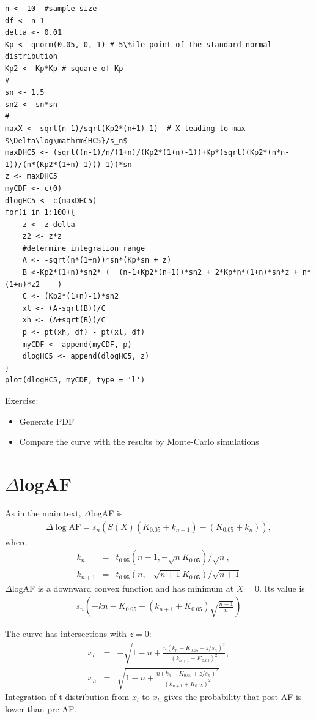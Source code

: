 \documentclass[10pt]{article}
\begin{document}
\begin{lstlisting}[caption=CDF of $\Delta\log\mathrm{HC5}/s_n$ (or that when $s_n$ is 1), label=fuga2]
n <- 10  #sample size
df <- n-1
delta <- 0.01
Kp <- qnorm(0.05, 0, 1) # 5\%ile point of the standard normal distribution
Kp2 <- Kp*Kp # square of Kp
#
sn <- 1.5
sn2 <- sn*sn
#
maxX <- sqrt(n-1)/sqrt(Kp2*(n+1)-1)  # X leading to max $\Delta\log\mathrm{HC5}/s_n$
maxDHC5 <- (sqrt((n-1)/n/(1+n)/(Kp2*(1+n)-1))+Kp*(sqrt((Kp2*(n*n-1))/(n*(Kp2*(1+n)-1)))-1))*sn
z <- maxDHC5
myCDF <- c(0)
dlogHC5 <- c(maxDHC5)
for(i in 1:100){
	z <- z-delta
	z2 <- z*z
	#determine integration range
	A <- -sqrt(n*(1+n))*sn*(Kp*sn + z)
	B <-Kp2*(1+n)*sn2* (  (n-1+Kp2*(n+1))*sn2 + 2*Kp*n*(1+n)*sn*z + n*(1+n)*z2    )
	C <- (Kp2*(1+n)-1)*sn2
	xl <- (A-sqrt(B))/C
	xh <- (A+sqrt(B))/C
	p <- pt(xh, df) - pt(xl, df)
	myCDF <- append(myCDF, p)
	dlogHC5 <- append(dlogHC5, z)
}
plot(dlogHC5, myCDF, type = 'l')
\end{lstlisting}

Exercise:
\begin{itemize}
\item Generate PDF
\item Compare the curve with the results by Monte-Carlo simulations
\end{itemize}

\newpage
\section{$\Delta$logAF}
As in the main text, $\Delta$logAF is 
\begin{eqnarray*}
\Delta\log\mathrm{AF} = s_n\left( S(X)(K_{0.05}+k_{n+1})-(K_{0.05}+k_n) \right), 
\end{eqnarray*}
where
\begin{eqnarray*}
k_n &=& t_{0.95}(n-1, -\sqrt{n}K_{0.05})/\sqrt{n}, \\
k_{n+1} &=& t_{0.95}(n, -\sqrt{n+1}K_{0.05})/\sqrt{n+1}
\end{eqnarray*}
$\Delta$logAF is a downward convex function and has minimum at $X=0$. Its value is 
\begin{eqnarray*}
s_n\left(-kn-K_{0.05}+(k_{n+1}+K_{0.05}) \sqrt{\frac{n-1}{n}} \right)
\end{eqnarray*}

The curve has intersections with $z=0$:
\begin{eqnarray*}
x_l &=& -\sqrt{1-n+\frac{n(k_n+K_{0.05}+z/s_n)^2}{(k_{n+1}+K_{0.05})^2}}, \\
x_h &=& \sqrt{1-n+\frac{n(k_n+K_{0.05}+z/s_n)^2}{(k_{n+1}+K_{0.05})^2}}
\end{eqnarray*}
Integration of t-distribution from $x_l$ to $x_h$ gives the probability that post-AF is lower than pre-AF. 
\end{document}
